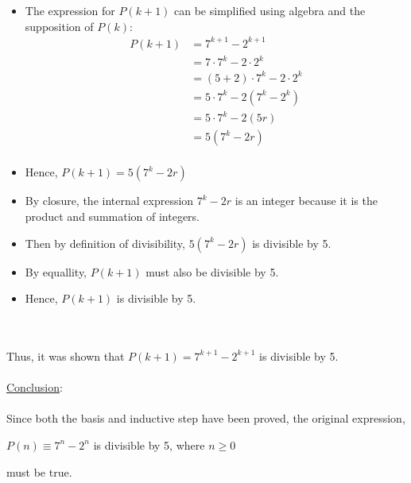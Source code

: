 \documentclass[12pt]{article}
\newcommand{\xlist}[1]{
    \begin{itemize}
        \renewcommand{\labelitemi}{$\centerdot$}
        #1
    \end{itemize}
    \newblock
    \\ \\
}
\newcommand{\xconclusion}[1]{
    \underline{Conclusion}:
    \\ \\
    #1
    \\ \\
}
\begin{document}
\xlist{
  \item The expression for $P(k+1)$ can be simplified using algebra and the supposition of $P(k)$:
  \begin{align*}
    P(k+1) &= 7^{k+1} - 2^{k+1} \\
    &= 7\cdot7^k - 2\cdot2^k \\
    &= (5+2)\cdot7^k - 2\cdot2^k \\
    &= 5\cdot7^k - 2(7^k -2^k) \\
    &= 5\cdot7^k - 2(5r) \\
    &= 5(7^k - 2r) \\
  \end{align*}
  \item Hence, $P(k+1) = 5(7^k - 2r)$
  \item By closure, the internal expression $7^k - 2r$ is an integer because it is the product and summation of integers.
  \item Then by definition of divisibility, $5(7^k - 2r)$ is divisible by 5.
  \item By equallity, $P(k+1)$ must also be divisible by 5. 
  \item Hence, $P(k+1)$ is divisible by 5.
}
Thus, it was shown that $P(k+1) = 7^{k+1} - 2^{k+1}$ is divisible by 5.
\\ \\
\xconclusion{
Since both the basis and inductive step have been proved, the original expression,
\begin{center}
  $P(n) \equiv 7^n - 2^n$ is divisible by 5, where $n \geq 0$
\end{center}
must be true.}
\end{document}
